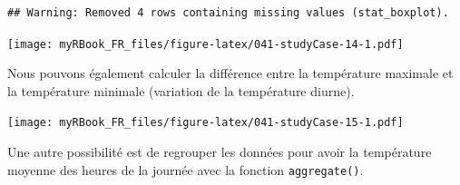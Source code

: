 \documentclass[
]{book}
\newenvironment{Shaded}{\begin{snugshade}}{\end{snugshade}}
\newcommand{\CommentTok}[1]{\textcolor[rgb]{0.56,0.35,0.01}{\textit{#1}}}
\newcommand{\DataTypeTok}[1]{\textcolor[rgb]{0.13,0.29,0.53}{#1}}
\newcommand{\DecValTok}[1]{\textcolor[rgb]{0.00,0.00,0.81}{#1}}
\newcommand{\KeywordTok}[1]{\textcolor[rgb]{0.13,0.29,0.53}{\textbf{#1}}}
\newcommand{\NormalTok}[1]{#1}
\newcommand{\OperatorTok}[1]{\textcolor[rgb]{0.81,0.36,0.00}{\textbf{#1}}}
\newcommand{\StringTok}[1]{\textcolor[rgb]{0.31,0.60,0.02}{#1}}
\begin{document}
\begin{verbatim}
## Warning: Removed 4 rows containing missing values (stat_boxplot).
\end{verbatim}

\texttt{[image: myRBook\_FR\_files/figure-latex/041-studyCase-14-1.pdf]}

Nous pouvons également calculer la différence entre la température maximale et la température minimale (variation de la température diurne).

\begin{Shaded}
\end{Shaded}

\texttt{[image: myRBook\_FR\_files/figure-latex/041-studyCase-15-1.pdf]}

Une autre possibilité est de regrouper les données pour avoir la température moyenne des heures de la journée avec la fonction \texttt{aggregate()}.
\end{document}
